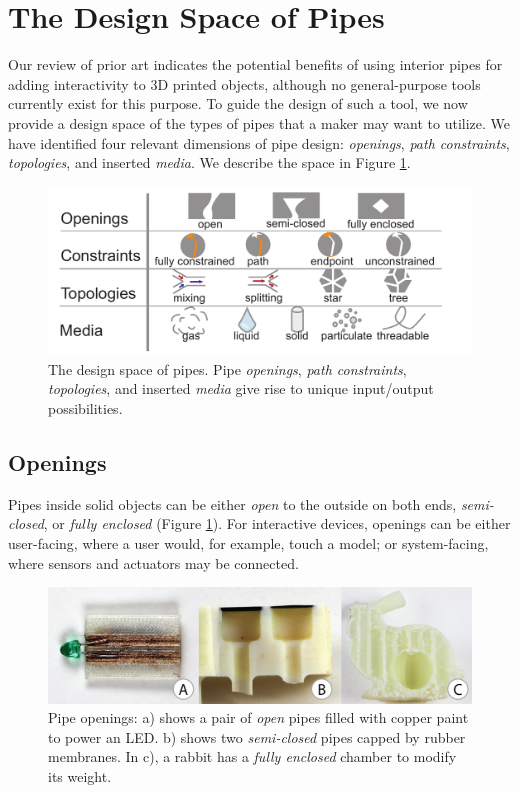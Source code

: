 
\section{The Design Space of Pipes}
Our review of prior art indicates the potential benefits of using interior pipes for adding interactivity to 3D printed objects, although no general-purpose tools currently exist for this purpose. To guide the design of such a tool, we now provide a design space of the types of pipes that a maker may want to utilize. We have identified four relevant dimensions of pipe design: \emph{openings}, \emph{path constraints}, \emph{topologies}, and inserted \emph{media}.  We describe the space in Figure \ref{fig:pipespace}.

\begin{figure}[t]
\centering
    \includegraphics[width=1.0\columnwidth]{figures/tubespace.pdf}
\caption{The design space of pipes.  Pipe \emph{openings}, \emph{path constraints}, \emph{topologies}, and inserted \emph{media} give rise to unique input/output possibilities.}
\label{fig:pipespace}
\end{figure}

\subsection{Openings}
Pipes inside solid objects can be either \emph{open} to the outside on both ends, \emph{semi-closed}, or \emph{fully enclosed} (Figure \ref{fig:pipespace}). For interactive devices, openings can be either user-facing, where a user would, for example, touch a model; or system-facing, where sensors and actuators may be connected.

\begin{figure}[t]
\centering
    \includegraphics[width=1.0\columnwidth]{figures/types.png}
\caption{Pipe openings: a) shows a pair of \emph{open} pipes filled with copper paint to power an LED.  b) shows two \emph{semi-closed} pipes capped by rubber membranes.  In c), a rabbit has a \emph{fully enclosed} chamber to modify its weight.}
\label{fig:openings}
\end{figure}

